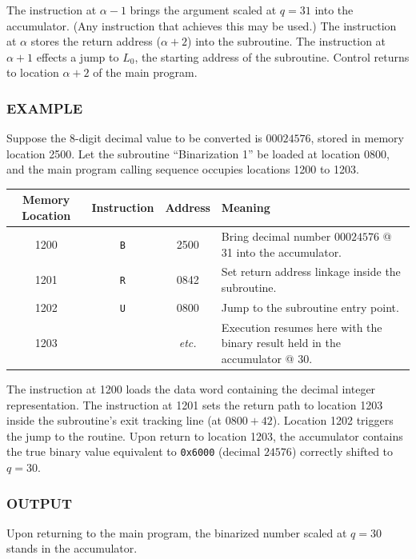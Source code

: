 The instruction at $\alpha-1$ brings the argument scaled at $q=31$ into the accumulator. (Any instruction that achieves this may be used.) The instruction at $\alpha$ stores the return address ($\alpha+2$) into the subroutine. The instruction at $\alpha+1$ effects a jump to $L_0$, the starting address of the subroutine. Control returns to location $\alpha+2$ of the main program.

\subsubsection*{EXAMPLE}
Suppose the 8-digit decimal value to be converted is $00024576$, stored in memory location 2500. Let the subroutine ``Binarization 1'' be loaded at location 0800, and the main program calling sequence occupies locations 1200 to 1203.

\begin{table}[h!]
\centering
\begin{tabularx}{\textwidth}{cccX}
\toprule
\textbf{Memory Location} & \textbf{Instruction} & \textbf{Address} & \textbf{Meaning} \\
\midrule
1200 & \texttt{B} & 2500 & Bring decimal number $00024576$ @ 31 into the accumulator. \\
1201 & \texttt{R} & 0842 & Set return address linkage inside the subroutine. \\
1202 & \texttt{U} & 0800 & Jump to the subroutine entry point. \\
1203 &            & \textit{etc.} & Execution resumes here with the binary result held in the accumulator @ 30. \\
\bottomrule
\end{tabularx}
\end{table}

The instruction at 1200 loads the data word containing the decimal integer representation. The instruction at 1201 sets the return path to location 1203 inside the subroutine's exit tracking line (at $0800 + 42$). Location 1202 triggers the jump to the routine. Upon return to location 1203, the accumulator contains the true binary value equivalent to \texttt{0x6000} (decimal $24576$) correctly shifted to $q=30$.

\subsubsection*{OUTPUT}
Upon returning to the main program, the binarized number scaled at $q = 30$ stands in the accumulator.

